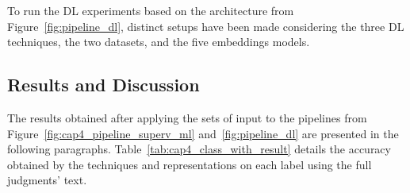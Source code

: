 
To run the \gls{DL} experiments based on the architecture from Figure~\ref{fig:pipeline_dl}, distinct setups have been made considering the three \gls{DL} techniques, the two datasets, and the five embeddings models. %


\subsection{Results and Discussion}


The results obtained after applying the sets of input to the pipelines from Figure~\ref{fig:cap4_pipeline_superv_ml} and~\ref{fig:pipeline_dl} are presented in the following paragraphs.
%
Table~\ref{tab:cap4_class_with_result} details the accuracy obtained by the techniques and representations on each label using the full judgments' text.

